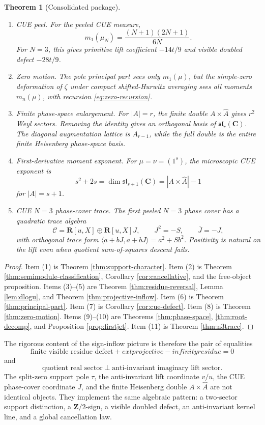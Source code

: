 \documentclass[11pt]{article}
\newcommand{\C}{\mathbf C}
\newcommand{\R}{\mathbf R}
\newcommand{\Z}{\mathbf Z}
\theoremstyle{plain}
\newtheorem{theorem}{Theorem}[section]
\theoremstyle{definition}
\numberwithin{equation}{section}
\begin{document}
\begin{theorem}[Consolidated package]
\begin{enumerate}[label=(\arabic*)]
\item \emph{CUE peel.}  For the peeled CUE measure,
\[
 m_1(\mu_N)=\frac{(N+1)(2N+1)}{6N}.
\]
For \(N=3\), this gives primitive lift coefficient \(-14t/9\) and visible doubled defect \(-28t/9\).

\item \emph{Zero motion.}  The pole principal part sees only \(m_1(\mu)\), but the simple-zero deformation of \(\zeta\) under compact shifted-Hurwitz averaging sees all moments \(m_n(\mu)\), with recursion \eqref{eq:zero-recursion}.

\item \emph{Finite phase-space enlargement.}  For \(|A|=r\), the finite double \(A\times\widehat A\) gives \(r^2\) Weyl sectors.  Removing the identity gives an orthogonal basis of \(\mathfrak{sl}_r(\C)\).  The diagonal augmentation lattice is \(A_{r-1}\), while the full double is the entire finite Heisenberg phase-space basis.

\item \emph{First-derivative moment exponent.}  For \(\mu=\nu=(1^s)\), the microscopic CUE exponent is
\[
 s^2+2s=\dim\mathfrak{sl}_{s+1}(\C)=|A\times\widehat A|-1
\]
for \(|A|=s+1\).

\item \emph{CUE \(N=3\) phase-cover trace.}  The first peeled \(N=3\) phase cover has a quadratic trace algebra
\[
 \mathcal C=\R[u,X]\oplus\R[u,X]J,
 \qquad
 J^2=-S,
 \qquad
 \overline J=-J,
\]
with orthogonal trace form \(\langle a+bJ,a+bJ\rangle=a^2+Sb^2\).  Positivity is natural on the lift even when quotient sum-of-squares descent fails.
\end{enumerate}
\end{theorem}

\begin{proof}
Item (1) is Theorem \ref{thm:support-character}.  Item (2) is Theorem \ref{thm:semimodule-classification}, Corollary \ref{cor:cancellative}, and the free-object proposition.  Items (3)--(5) are Theorem \ref{thm:residue-reversal}, Lemma \ref{lem:dlogu}, and Theorem \ref{thm:projective-inflow}.  Item (6) is Theorem \ref{thm:principal-part}.  Item (7) is Corollary \ref{cor:cue-defect}.  Item (8) is Theorem \ref{thm:zero-motion}.  Items (9)--(10) are Theorems \ref{thm:phase-space}, \ref{thm:root-decomp}, and Proposition \ref{prop:firstjet}.  Item (11) is Theorem \ref{thm:n3trace}.
\end{proof}

The rigorous content of the sign-inflow picture is therefore the pair of equalities
\[
 \boxed{\text{finite visible residue defect}+	ext{projective-infinity residue}=0}
\]
and
\[
 \boxed{\text{quotient real sector}\perp\text{anti-invariant imaginary lift sector}.}
\]
The split-zero support pole \(\tau\), the anti-invariant lift coordinate \(v/u\), the CUE phase-cover coordinate \(J\), and the finite Heisenberg double \(A\times\widehat A\) are not identical objects.  They implement the same algebraic pattern: a two-sector support distinction, a \(\Z/2\)-sign, a visible doubled defect, an anti-invariant kernel line, and a global cancellation law.
\end{document}
